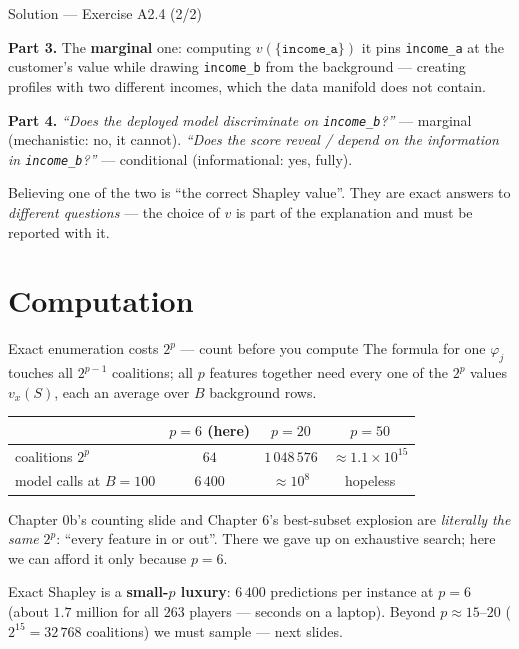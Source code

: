 \documentclass[aspectratio=169,11pt]{beamer}
\begin{document}
\begin{frame}{Solution --- Exercise A2.4 (2/2)}
\begin{solutionbox}
  \smallskip
  \textbf{Part 3.} The \textbf{marginal} one: computing
  $v(\{\texttt{income\_a}\})$ it pins \texttt{income\_a} at the customer's value
  while drawing \texttt{income\_b} from the background --- creating profiles with
  two different incomes, which the data manifold does not contain.

  \smallskip
  \textbf{Part 4.} \emph{``Does the deployed model discriminate on
  \texttt{income\_b}?''} --- marginal (mechanistic: no, it cannot).
  \emph{``Does the score reveal / depend on the information in
  \texttt{income\_b}?''} --- conditional (informational: yes, fully).
\end{solutionbox}
\begin{mistake}
  Believing one of the two is ``the correct Shapley value''. They are exact answers
  to \emph{different questions} --- the choice of $v$ is part of the explanation and
  must be reported with it.
\end{mistake}
\end{frame}

\section{Computation}

\begin{frame}{Exact enumeration costs $2^p$ --- count before you compute}
  \footnotesize
  The formula for one $\varphi_j$ touches all $2^{p-1}$ coalitions; all $p$
  features together need every one of the $2^p$ values $v_x(S)$, each an average
  over $B$ background rows.
  \begin{numexample}
    \begin{center}
    \begin{tabular}{@{}lccc@{}}
      \toprule
      & $p=6$ (here) & $p=20$ & $p=50$ \\
      \midrule
      coalitions $2^p$ & $64$ & $1\,048\,576$ & $\approx 1.1\times10^{15}$ \\
      model calls at $B=100$ & $6\,400$ & $\approx 10^{8}$ & hopeless \\
      \bottomrule
    \end{tabular}
    \end{center}
    Chapter 0b's counting slide and Chapter 6's best-subset explosion are
    \emph{literally the same} $2^p$: ``every feature in or out''. There we gave up
    on exhaustive search; here we can afford it only because $p=6$.
  \end{numexample}
  \begin{takeaway}
    Exact Shapley is a \textbf{small-$p$ luxury}: $6\,400$ predictions per instance at
    $p=6$ (about $1.7$ million for all $263$ players --- seconds on a laptop). Beyond
    $p\approx 15$--$20$ ($2^{15}=32\,768$ coalitions) we must sample --- next slides.
  \end{takeaway}
\end{frame}
\end{document}
